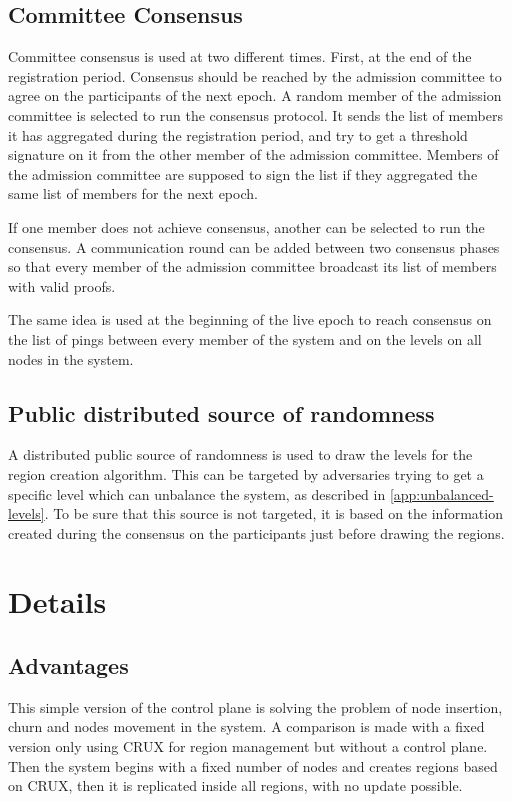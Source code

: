\documentclass[a4paper,11pt,twoside=semi,openright]{report}
\begin{document}
\subsection{Committee Consensus}
Committee consensus is used at two different times. First, at the end of the
registration period. Consensus should be reached by the admission committee to
agree on the participants of the next epoch. A random member of the admission
committee is selected to run the consensus protocol. It sends the list of
members it has aggregated during the registration period, and try to get a
threshold signature on it from the other member of the admission committee.
Members of the admission committee are supposed to sign the list if they
aggregated the same list of members for the next epoch.

If one member does not achieve consensus, another can be selected to
run the consensus. A communication round can be added between two consensus
phases so that every member of the admission committee broadcast its list
of members with valid proofs.

The same idea is used at the beginning of the live epoch to reach consensus on
the list of pings between every member of the system and on the levels on all
nodes in the system.

\subsection{Public distributed source of randomness}
A distributed public source of randomness is used to draw the levels for the
region creation algorithm. This can be targeted by adversaries trying to get a
specific level which can unbalance the system, as described in
\autoref{app:unbalanced-levels}. To be sure that this source is not targeted,
it is based on the information created during the consensus on the participants
just before drawing the regions. 

\FloatBarrier \section{Details}
\subsection{Advantages}
This simple version of the control plane is solving the problem of node
insertion, churn and nodes movement in the system. A comparison is made
with a fixed version only using CRUX for region management but without a
control plane. Then the system begins with a fixed number of nodes and creates
regions based on CRUX, then it is replicated inside all regions, with
no update possible.
\end{document}
